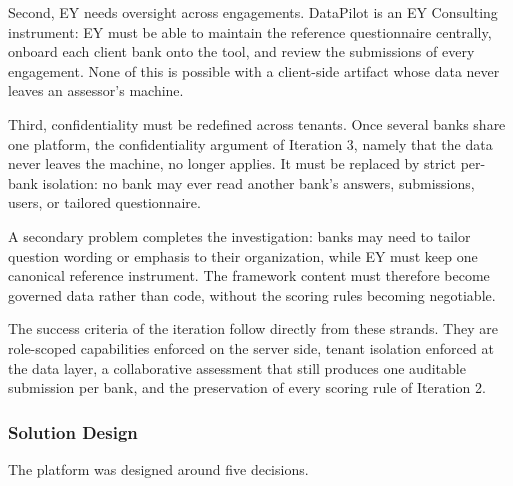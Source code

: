 Second, EY needs oversight across engagements. DataPilot is an EY Consulting instrument: EY must be able to maintain the reference questionnaire centrally, onboard each client bank onto the tool, and review the submissions of every engagement. None of this is possible with a client-side artifact whose data never leaves an assessor's machine.

Third, confidentiality must be redefined across tenants. Once several banks share one platform, the confidentiality argument of Iteration 3, namely that the data never leaves the machine, no longer applies. It must be replaced by strict per-bank isolation: no bank may ever read another bank's answers, submissions, users, or tailored questionnaire.

A secondary problem completes the investigation: banks may need to tailor question wording or emphasis to their organization, while EY must keep one canonical reference instrument. The framework content must therefore become governed data rather than code, without the scoring rules becoming negotiable.

The success criteria of the iteration follow directly from these strands. They are role-scoped capabilities enforced on the server side, tenant isolation enforced at the data layer, a collaborative assessment that still produces one auditable submission per bank, and the preservation of every scoring rule of Iteration 2.

\subsubsection{Solution Design}

The platform was designed around five decisions.

